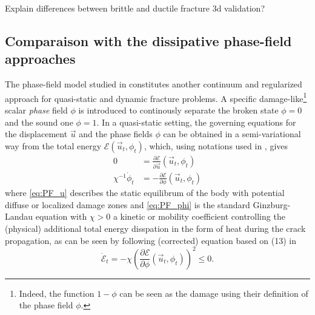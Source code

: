 Explain differences between brittle and ductile fracture
3d validation?

\subsection{Comparaison with the dissipative phase-field approaches}

The phase-field model studied in \cite{KarmaKesslerLevine:2001,HakimKarma:2009} constitutes another continuum and regularized approach for quasi-static and dynamic fracture problems. A specific damage-like\footnote{Indeed, the function $1-\phi$ can be seen as the damage using their definition of the phase field $\phi$.} scalar \emph{phase} field $\phi$ is introduced to continously separate the broken state $\phi=0$ and the sound one $\phi=1$. In a quasi-static setting, the governing equations for the displacement $\vec{u}$ and the phase fields $\phi$ can be obtained in a semi-variational way from the total energy $\mathcal{E}(\vec{u}_t,\phi_t)$, which, using notations used in \cite{HakimKarma:2009}, gives
\begin{align}
0 &= \frac{\partial\mathcal{E}}{\partial\vec{u}}(\vec{u}_t,\phi_t) \label{eq:PF_u} \\
\chi^{-1}\dot{\phi}_t &= -\frac{\partial\mathcal{E}}{\partial\phi}(\vec{u}_t,\phi_t) \label{eq:PF_phi}
\end{align}
where \eqref{eq:PF_u} describes the static equilibrum of the body with potential diffuse or localized damage zones and \eqref{eq:PF_phi} is the standard Ginzburg-Landau equation with $\chi>0$ a kinetic or mobility \cite{KuhnMuller:2010} coefficient controlling the (physical) additional total energy disspation in the form of heat during the crack propagation, as can be seen by following (corrected) equation based on (13) in \cite{HakimKarma:2009}
\begin{equation} \label{eq:PF_dissipation}
\dot{\mathcal{E}}_t=-\chi\left(\frac{\partial\mathcal{E}}{\partial\phi}(\vec{u}_t,\phi_t)\right)^2\leq 0.
\end{equation}

